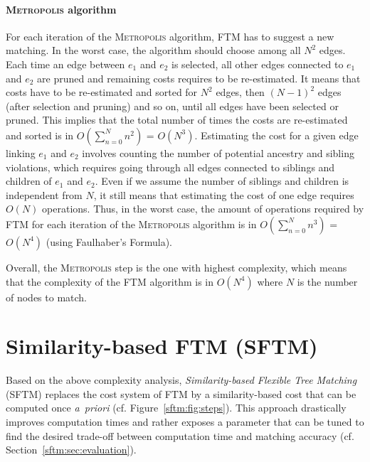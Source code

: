 \paragraph{\textsc{Metropolis} algorithm}
For each iteration of the \textsc{Metropolis} algorithm, FTM has to suggest a new matching.
In the worst case, the algorithm should choose among all $N^2$ edges.
Each time an edge between $e_1$ and $e_2$ is selected, all other edges connected to $e_1$ and $e_2$ are pruned and remaining costs requires to be re-estimated.
It means that costs have to be re-estimated and sorted for $N^2$ edges, then $(N-1)^2$ edges (after selection and pruning) and so on, until all edges have been selected or pruned.
This implies that the total number of times the costs are re-estimated and sorted is in $O(\sum^N_{n = 0}n^2)$ = $O(N^3)$.
Estimating the cost for a given edge linking $e_1$ and $e_2$ involves counting the number of potential ancestry and sibling violations, which requires going through all edges connected to siblings and children of $e_1$ and $e_2$.
Even if we assume the number of siblings and children is independent from $N$, it still means that estimating the cost of one edge requires $O(N)$ operations.
Thus, in the worst case, the amount of operations required by FTM for each iteration of the \textsc{Metropolis} algorithm is in $O(\sum^N_{n = 0}n^3)$ = $O(N^4)$ (using Faulhaber's Formula).

Overall, the \textsc{Metropolis} step is the one with highest complexity, which means that the complexity of the FTM algorithm is in $O(N^4)$ where $N$ is the number of nodes to match.

\section{Similarity-based FTM (SFTM)}\label{sftm:sec:SFTM}
Based on the above complexity analysis, \emph{Similarity-based Flexible Tree Matching} (SFTM) replaces the cost system of FTM by a similarity-based cost that can be computed once \textit{a~priori} (cf. Figure~\ref{sftm:fig:steps}).
This approach drastically improves computation times and rather exposes a parameter that can be tuned to find the desired trade-off between computation time and matching accuracy (cf. Section~\ref{sftm:sec:evaluation}).


